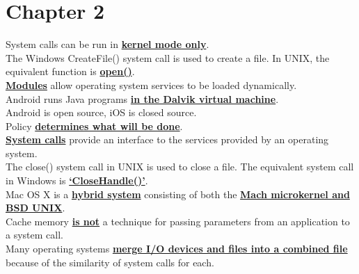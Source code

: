\documentclass[10pt]{article}
\newcommand{\qw}[1]{\textbf{\ul{#1}}}
\begin{document}
\section*{\centering Chapter 2}
System calls can be run in \qw{kernel mode only}.\\[2mm]
The Windows CreateFile() system call is used to create a file. In UNIX, the equivalent function is \qw{open()}.\\[2mm]
\qw{Modules} allow operating system services to be loaded dynamically.\\[2mm]
Android runs Java programs \qw{in the Dalvik virtual machine}.\\[2mm]
Android is open source, iOS is closed source.\\[2mm]
Policy \qw{determines what will be done}.\\[2mm]
\qw{System calls} provide an interface to the services provided by an operating system.\\[2mm]
The close() system call in UNIX is used to close a file. The equivalent system call in Windows is \qw{`CloseHandle()'}.\\[2mm]
Mac OS X is a \qw{hybrid system} consisting of both the \qw{Mach microkernel and BSD UNIX}.\\[2mm]
Cache memory \qw{is not} a technique for passing parameters from an application to a system call.\\[2mm]
Many operating systems \qw{merge I/O devices and files into a combined file} because of the similarity of system calls for each.
\newpage
\end{document}
